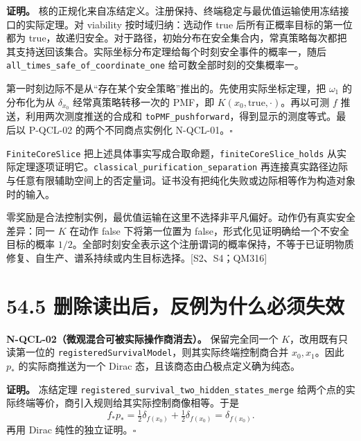 \documentclass[
  11pt,
  oneside]{book}
\begin{document}
\textbf{证明。}
核的正规化来自冻结定义。注册保持、终端稳定与最优值运输使用冻结接口的实际定理。对
viability 按时域归纳：选动作 true 后所有正概率目标的第一位都为
true，故递归安全。对于路径，初始分布在安全集合内，常真策略每次都把其支持送回该集合。实际坐标分布定理给每个时刻安全事件的概率一，随后
\texttt{all\_\allowbreak times\_\allowbreak safe\_\allowbreak of\_\allowbreak coordinate\_\allowbreak one}
给可数全部时刻的交集概率一。

第一时刻边际不是从``存在某个安全策略''推出的。先使用实际坐标定理，把
\(\omega_1\) 的分布化为从 \(\delta_{x_0}\) 经常真策略转移一次的 PMF，即
\(K(x_0,\mathrm{true},\cdot)\)。再以可测 \(f\)
推送，利用两次测度推送的合成和
\texttt{toPMF\_\allowbreak pushforward}，得到显示的测度等式。最后以 P-QCL-02
的两个不同商点实例化 N-QCL-01。\(\square\)

\texttt{FiniteCoreSlice}
把上述具体事实写成合取命题，\texttt{finiteCoreSlice\_\allowbreak holds}
从实际定理逐项证明它。\texttt{classical\_\allowbreak purification\_\allowbreak separation}
再连接真实路径边际与任意有限辅助空间上的否定量词。证书没有把纯化失败或边际相等作为构造对象时的输入。

零奖励是合法控制实例，最优值运输在这里不选择非平凡偏好。动作仍有真实安全差异：同一
\(K\) 在动作 false 下将第一位置为
false，形式化见证明确给一个不安全目标的概率
\(1/2\)。全部时刻安全表示这个注册谓词的概率保持，不等于已证明物质修复、自生产、谱系持续或内生目标选择。{[}S2、S4；QM316{]}

\hypertarget{ux5220ux9664ux8bfbux51faux540eux53cdux4f8bux4e3aux4ec0ux4e48ux5fc5ux987bux5931ux6548}{%
\section{54.5
删除读出后，反例为什么必须失效}\label{ux5220ux9664ux8bfbux51faux540eux53cdux4f8bux4e3aux4ec0ux4e48ux5fc5ux987bux5931ux6548}}

\protect\hypertarget{n-qcl-02}{}{}

\textbf{N-QCL-02（微观混合可被实际操作商消去）。} 保留完全同一个
\(K\)，改用既有只读第一位的
\texttt{registeredSurvivalModel}，则其实际终端控制商合并
\(x_0,x_1\)。因此 \(p_*\) 的实际商推送为一个 Dirac
态，且该商态由凸极点定义确为纯态。

\textbf{证明。} 冻结定理
\texttt{registered\_\allowbreak survival\_\allowbreak two\_\allowbreak hidden\_\allowbreak states\_\allowbreak merge}
给两个点的实际终端等价，商引入规则给其实际控制商像相等。于是 \[
f_*p_* = \tfrac12\delta_{f(x_0)}+\tfrac12\delta_{f(x_0)}
=\delta_{f(x_0)}.
\] 再用 Dirac 纯性的独立证明。\(\square\)
\end{document}
